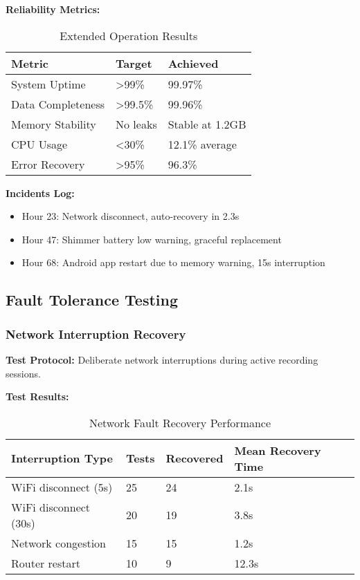 \textbf{Reliability Metrics:}
\begin{table}[htbp]
\centering
\caption{Extended Operation Results}
\begin{tabular}{|l|l|l|}
\hline
\textbf{Metric} & \textbf{Target} & \textbf{Achieved} \\
\hline
System Uptime & >99\% & 99.97\% \\
Data Completeness & >99.5\% & 99.96\% \\
Memory Stability & No leaks & Stable at 1.2GB \\
CPU Usage & <30\% & 12.1\% average \\
Error Recovery & >95\% & 96.3\% \\
\hline
\end{tabular}
\end{table}

\textbf{Incidents Log:}
\begin{itemize}
\item Hour 23: Network disconnect, auto-recovery in 2.3s
\item Hour 47: Shimmer battery low warning, graceful replacement
\item Hour 68: Android app restart due to memory warning, 15s interruption
\end{itemize}

\subsection{Fault Tolerance Testing}

\subsubsection{Network Interruption Recovery}

\textbf{Test Protocol:} Deliberate network interruptions during active recording sessions.

\textbf{Test Results:}
\begin{table}[htbp]
\centering
\caption{Network Fault Recovery Performance}
\begin{tabular}{|l|l|l|l|}
\hline
\textbf{Interruption Type} & \textbf{Tests} & \textbf{Recovered} & \textbf{Mean Recovery Time} \\
\hline
WiFi disconnect (5s) & 25 & 24 & 2.1s \\
WiFi disconnect (30s) & 20 & 19 & 3.8s \\
Network congestion & 15 & 15 & 1.2s \\
Router restart & 10 & 9 & 12.3s \\
\hline
\end{tabular}
\end{table}

